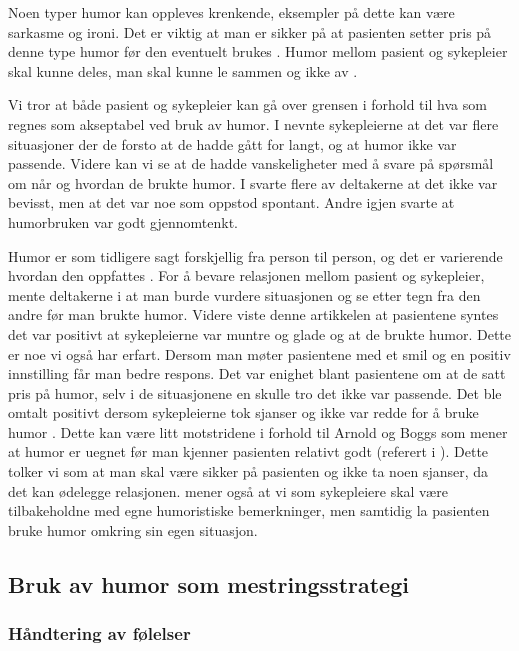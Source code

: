 Noen typer humor kan oppleves krenkende, eksempler på dette kan være sarkasme
og ironi. Det er viktig at man er sikker på at pasienten setter pris på denne
type humor før den eventuelt brukes \cite{eide2008}. Humor mellom pasient og
sykepleier skal kunne deles, man skal kunne le sammen og ikke av
\cite{wist2002}.

Vi tror at både pasient og sykepleier kan gå over grensen i forhold til hva som
regnes som akseptabel ved bruk av humor. I  nevnte sykepleierne
at det var flere situasjoner der de forsto at de hadde gått for langt, og at
humor ikke var passende. Videre kan vi se at de hadde vanskeligheter med å
svare på spørsmål om når og hvordan de brukte humor. I  svarte
flere av deltakerne at det ikke var bevisst, men at det var noe som oppstod
spontant. Andre igjen svarte at humorbruken var godt gjennomtenkt.

Humor er som tidligere sagt forskjellig fra person til person, og det er
varierende hvordan den oppfattes \cite{bjork2011}. For å bevare relasjonen
mellom pasient og sykepleier, mente deltakerne i  at man
burde vurdere situasjonen og se etter tegn fra den andre før man brukte humor.
Videre viste denne artikkelen at pasientene syntes det var positivt at
sykepleierne var muntre og glade og at de brukte humor. Dette er noe vi også
har erfart. Dersom man møter pasientene med et smil og en positiv innstilling
får man bedre respons. Det var enighet blant pasientene om at de satt pris på
humor, selv i de situasjonene en skulle tro det ikke var passende. Det ble
omtalt positivt dersom sykepleierne tok sjanser og ikke var redde for å bruke
humor \cite{mccreaddie2011}. Dette kan være litt motstridene i forhold til
Arnold og Boggs som mener at humor er uegnet før man kjenner pasienten relativt
godt (referert i ). Dette tolker vi som at man skal være
sikker på pasienten og ikke ta noen sjanser, da det kan ødelegge relasjonen.
 mener også at vi som sykepleiere skal være tilbakeholdne med
egne humoristiske bemerkninger, men samtidig la pasienten bruke humor omkring
sin egen situasjon.

\subsection{Bruk av humor som mestringsstrategi}

\subsubsection{Håndtering av følelser}


